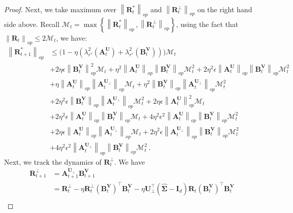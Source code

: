 \begin{proof}
    Next, we take maximum over $\left\|\bm R^*_{t}\right\|_{op}$  and $\left\|\bm R^\perp_{t}\right\|_{op}$ on the right hand side above. Recall $\mathcal{M}_t=\max \left\{\left\|\bm R^*_{t}\right\|_{op}\,,\left\|\bm R^\perp_{t}\right\|_{op}\right\}$, using the fact that $\left\|\bm R_{t}\right\|_{op}\leq 2 \mathcal{M}_t$, we have:
    \begin{align*}
        \left\|\bm R^*_{t+1}\right\|_{op} & \leq \bigg(1-\eta\left(\lambda_{r^*}^2\left(\bm A_t^{\bm U}\right)+\lambda_{r^*}^2\left(\bm B_t^{\bm V}\right)\right)\bigg)\mathcal{M}_t\\
        & + 2\eta \epsilon \left\|\bm B^{\bm V}_{t}\right\|_{op}^2 \mathcal{M}_t + \eta^2 \left\|\bm A^{\bm U}_{t}\right\|_{op}\left\|\bm B^{\bm V}_{t}\right\|_{op}\mathcal{M}_t^2 + 2\eta^2 \epsilon \left\|\bm A^{\bm U}_{t}\right\|_{op}\left\|\bm B^{\bm V}_{t}\right\|_{op}\mathcal{M}_t^2\\
        & + \eta \left\|\bm A^{\bm U}_{t}\right\|_{op}\left\|\bm A^{\bm U_\perp}_{t}\right\|_{op}\mathcal{M}_t+\eta^2 \left\|\bm B^{\bm V}_{t}\right\|_{op}\left\|\bm A^{\bm U_\perp}_{t}\right\|_{op}\mathcal{M}_t^2\\
        & +2\eta^2 \epsilon \left\|\bm B^{\bm V}_{t}\right\|_{op}\left\|\bm A^{\bm U_\perp}_{t}\right\|_{op}\mathcal{M}_t^2+2\eta \epsilon \left\|\bm A^{\bm U}_{t}\right\|_{op}^2 \mathcal{M}_t\\
        & + 2 \eta^2 \epsilon \left\|\bm A^{\bm U}_{t}\right\|_{op}\left\|\bm B^{\bm V}_{t}\right\|_{op} \mathcal{M}_t + 4 \eta^2 \epsilon^2 \left\|\bm A^{\bm U}_{t}\right\|_{op}\left\|\bm B^{\bm V}_{t}\right\|_{op} \mathcal{M}_t^2\\
        & + 2 \eta \epsilon \left\|\bm A^{\bm U}_{t}\right\|_{op}\left\|\bm A^{\bm U_\perp}_{t}\right\|_{op}\mathcal{M}_t+2\eta^2 \epsilon \left\|\bm A^{\bm U_\perp}_{t}\right\|_{op}\left\|\bm B^{\bm V}_{t}\right\|_{op}\mathcal{M}_t^2\\
        & + 4 \eta^2 \epsilon^2 \left\|\bm A^{\bm U_\perp}_{t}\right\|_{op}\left\|\bm B^{\bm V}_{t}\right\|_{op} \mathcal{M}_t^2\,.
    \end{align*}
    Next, we track the dynamics of $\bm R^\perp_t$. We have
    \begin{align*}
        \bm R^\perp_{t+1} & = \bm A^{\bm U_\perp}_{t+1}\bm B_{t+1}^{\bm V}\\
        & = \bm R^\perp_t
        - \eta \bm R^\perp_t \left(\bm B_t^{\bm V}\right)^{\!\top}\bm B_{t}^{\bm V}
        - \eta \bm U_\perp^{\!\top}\left(\widehat{\bm \Sigma}
        - \bm I_d\right) \bm R_t \left(\bm B_t^{\bm V}\right)^{\!\top}\bm B_{t}^{\bm V}\\

\end{align*}
\end{proof}
